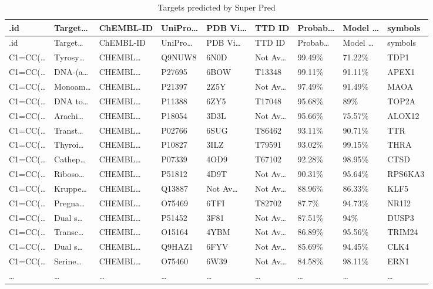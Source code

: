 \documentclass[
]{article}
\begin{document}
\begin{longtable}[]{@{}lllllllll@{}}
\caption{\label{tab:Targets-predicted-by-Super-Pred}Targets predicted by Super Pred}\tabularnewline
\toprule
.id & Target\ldots{} & ChEMBL-ID & UniPro\ldots{} & PDB Vi\ldots{} & TTD ID & Probab\ldots{} & Model \ldots{} & symbols\tabularnewline
\midrule
\endfirsthead
\toprule
.id & Target\ldots{} & ChEMBL-ID & UniPro\ldots{} & PDB Vi\ldots{} & TTD ID & Probab\ldots{} & Model \ldots{} & symbols\tabularnewline
\midrule
\endhead
C1=CC(\ldots{} & Tyrosy\ldots{} & CHEMBL\ldots{} & Q9NUW8 & 6N0D & Not Av\ldots{} & 99.49\% & 71.22\% & TDP1\tabularnewline
C1=CC(\ldots{} & DNA-(a\ldots{} & CHEMBL\ldots{} & P27695 & 6BOW & T13348 & 99.11\% & 91.11\% & APEX1\tabularnewline
C1=CC(\ldots{} & Monoam\ldots{} & CHEMBL\ldots{} & P21397 & 2Z5Y & Not Av\ldots{} & 97.49\% & 91.49\% & MAOA\tabularnewline
C1=CC(\ldots{} & DNA to\ldots{} & CHEMBL\ldots{} & P11388 & 6ZY5 & T17048 & 95.68\% & 89\% & TOP2A\tabularnewline
C1=CC(\ldots{} & Arachi\ldots{} & CHEMBL\ldots{} & P18054 & 3D3L & Not Av\ldots{} & 95.66\% & 75.57\% & ALOX12\tabularnewline
C1=CC(\ldots{} & Transt\ldots{} & CHEMBL\ldots{} & P02766 & 6SUG & T86462 & 93.11\% & 90.71\% & TTR\tabularnewline
C1=CC(\ldots{} & Thyroi\ldots{} & CHEMBL\ldots{} & P10827 & 3ILZ & T79591 & 93.02\% & 99.15\% & THRA\tabularnewline
C1=CC(\ldots{} & Cathep\ldots{} & CHEMBL\ldots{} & P07339 & 4OD9 & T67102 & 92.28\% & 98.95\% & CTSD\tabularnewline
C1=CC(\ldots{} & Riboso\ldots{} & CHEMBL\ldots{} & P51812 & 4D9T & Not Av\ldots{} & 90.31\% & 95.64\% & RPS6KA3\tabularnewline
C1=CC(\ldots{} & Kruppe\ldots{} & CHEMBL\ldots{} & Q13887 & Not Av\ldots{} & Not Av\ldots{} & 88.96\% & 86.33\% & KLF5\tabularnewline
C1=CC(\ldots{} & Pregna\ldots{} & CHEMBL\ldots{} & O75469 & 6TFI & T82702 & 87.7\% & 94.73\% & NR1I2\tabularnewline
C1=CC(\ldots{} & Dual s\ldots{} & CHEMBL\ldots{} & P51452 & 3F81 & Not Av\ldots{} & 87.51\% & 94\% & DUSP3\tabularnewline
C1=CC(\ldots{} & Transc\ldots{} & CHEMBL\ldots{} & O15164 & 4YBM & Not Av\ldots{} & 86.89\% & 95.56\% & TRIM24\tabularnewline
C1=CC(\ldots{} & Dual s\ldots{} & CHEMBL\ldots{} & Q9HAZ1 & 6FYV & Not Av\ldots{} & 85.69\% & 94.45\% & CLK4\tabularnewline
C1=CC(\ldots{} & Serine\ldots{} & CHEMBL\ldots{} & O75460 & 6W39 & Not Av\ldots{} & 84.58\% & 98.11\% & ERN1\tabularnewline
\ldots{} & \ldots{} & \ldots{} & \ldots{} & \ldots{} & \ldots{} & \ldots{} & \ldots{} & \ldots{}\tabularnewline
\bottomrule
\end{longtable}

\begin{center}\vspace{1.5cm}\end{center}
\end{document}
